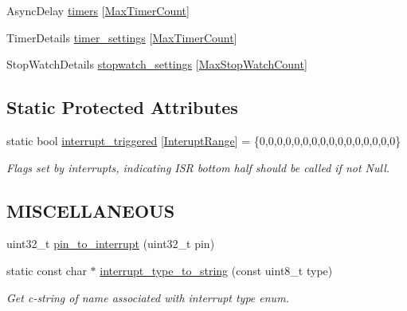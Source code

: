 \begin{DoxyCompactItemize}
Async\+Delay \hyperlink{class_loom___interrupt___manager_aee0fc09dd7023b4d740932bb44a705c4}{timers} \mbox{[}\hyperlink{_interrupt___manager_8h_a36969e07126fb846ed24bde87f6d8f73}{Max\+Timer\+Count}\mbox{]}
\item 
Timer\+Details \hyperlink{class_loom___interrupt___manager_a77b5bb21e151ca476b9e9cf8e45eaad6}{timer\+\_\+settings} \mbox{[}\hyperlink{_interrupt___manager_8h_a36969e07126fb846ed24bde87f6d8f73}{Max\+Timer\+Count}\mbox{]}
\item 
Stop\+Watch\+Details \hyperlink{class_loom___interrupt___manager_a70c3fa86880738c1090071003b76cdc5}{stopwatch\+\_\+settings} \mbox{[}\hyperlink{_interrupt___manager_8h_a35dff5f1ee3055a319a9a773535b0ecf}{Max\+Stop\+Watch\+Count}\mbox{]}
\end{DoxyCompactItemize}
\subsection*{Static Protected Attributes}
\begin{DoxyCompactItemize}
\item 
static bool \hyperlink{class_loom___interrupt___manager_a12c988c69d8e14c845a736e032ac3575}{interrupt\+\_\+triggered} \mbox{[}\hyperlink{_interrupt___manager_8h_a3fbf8a43703481c17414cec74c056c5a}{Interupt\+Range}\mbox{]} = \{0,0,0,0,0,0,0,0,0,0,0,0,0,0,0,0\}
\begin{DoxyCompactList}\small\item\em Flags set by interrupts, indicating I\+SR bottom half should be called if not Null. \end{DoxyCompactList}\end{DoxyCompactItemize}
\subsection*{M\+I\+S\+C\+E\+L\+L\+A\+N\+E\+O\+US}
\begin{DoxyCompactItemize}
\item 
uint32\+\_\+t \hyperlink{class_loom___interrupt___manager_a212f9cf070fb64c56d9ff675139278a4}{pin\+\_\+to\+\_\+interrupt} (uint32\+\_\+t pin)
\item 
static const char $\ast$ \hyperlink{class_loom___interrupt___manager_a9627a5c793fa172b25c4ff0078fe7193}{interrupt\+\_\+type\+\_\+to\+\_\+string} (const uint8\+\_\+t type)
\begin{DoxyCompactList}\small\item\em Get c-\/string of name associated with interrupt type enum. \end{DoxyCompactList}\end{DoxyCompactItemize}
